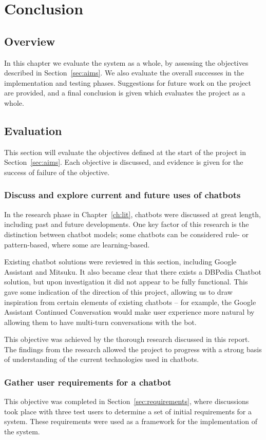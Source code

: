 \chapter{Conclusion}
\label{ch:conclusion}
\section{Overview}
In this chapter we evaluate the system as a whole, by assessing the objectives described in Section~\ref{sec:aims}. We also evaluate the overall successes in the implementation and testing phases. Suggestions for future work on the project are provided, and a final conclusion is given which evaluates the project as a whole.
\section{Evaluation}
This section will evaluate the objectives defined at the start of the project in Section~\ref{sec:aims}. Each objective is discussed, and evidence is given for the success of failure of the objective. 

\subsection{Discuss and explore current and future uses of chatbots}
In the research phase in Chapter~\ref{ch:lit}, chatbots were discussed at great length, including past and future developments. One key factor of this research is the distinction between chatbot models; some chatbots can be considered rule- or pattern-based, where some are learning-based.

Existing chatbot solutions were reviewed in this section, including Google Assistant and Mitsuku. It also became clear that there exists a DBPedia Chatbot solution, but upon investigation it did not appear to be fully functional. This gave some indication of the direction of this project, allowing us to draw inspiration from certain elements of existing chatbots -- for example, the Google Assistant Continued Conversation \cite{googleassistant} would make user experience more natural by allowing them to have multi-turn conversations with the bot.

This objective was achieved by the thorough research discussed in this report. The findings from the research allowed the project to progress with a strong basis of understanding of the current technologies used in chatbots.

\subsection{Gather user requirements for a chatbot}
This objective was completed in Section~\ref{sec:requirements}, where discussions took place with three test users to determine a set of initial requirements for a system. These requirements were used as a framework for the implementation of the system.

